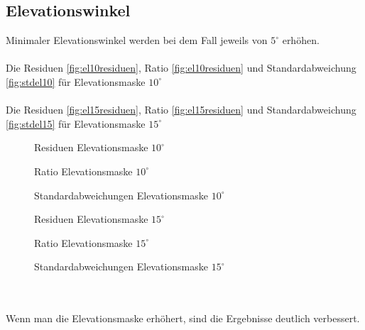\subsection{Elevationswinkel}
Minimaler Elevationswinkel werden bei dem Fall jeweils von $5^{\circ}$ erhöhen.\\\\
Die Residuen \autoref{fig:el10residuen}, Ratio \autoref{fig:el10residuen} und Standardabweichung \autoref{fig:stdel10} für Elevationsmaske $10^{\circ}$\\\\
Die Residuen \autoref{fig:el15residuen}, Ratio \autoref{fig:el15residuen} und Standardabweichung \autoref{fig:stdel15} für Elevationsmaske $15^{\circ}$
\begin{figure}[ht]\centering  
	\caption{Residuen Elevationsmaske $10^{\circ}$}
	\label{fig:el10residuen}
\end{figure}
\begin{figure}[ht]\centering 
	\caption{Ratio Elevationsmaske $10^{\circ}$}
	\label{fig:Ratioel10}
\end{figure}
\begin{figure}[ht]\centering 
	\caption{Standardabweichungen Elevationsmaske $10^{\circ}$}
	\label{fig:stdel10}
\end{figure}
\begin{figure}[ht]\centering  
	\caption{Residuen Elevationsmaske $15^{\circ}$}
	\label{fig:el15residuen}
\end{figure}
\begin{figure}[ht]\centering 
	\caption{Ratio Elevationsmaske $15^{\circ}$}
	\label{fig:Ratioel15}
\end{figure}
\begin{figure}[ht]\centering 
	\caption{Standardabweichungen Elevationsmaske $15^{\circ}$}
	\label{fig:stdel15}
\end{figure}\\\\
Wenn man die Elevationsmaske erhöhert, sind die Ergebnisse deutlich verbessert. 
\clearpage
